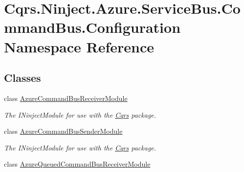 \hypertarget{namespaceCqrs_1_1Ninject_1_1Azure_1_1ServiceBus_1_1CommandBus_1_1Configuration}{}\section{Cqrs.\+Ninject.\+Azure.\+Service\+Bus.\+Command\+Bus.\+Configuration Namespace Reference}
\label{namespaceCqrs_1_1Ninject_1_1Azure_1_1ServiceBus_1_1CommandBus_1_1Configuration}
\subsection*{Classes}
\begin{DoxyCompactItemize}
\item 
class \hyperlink{classCqrs_1_1Ninject_1_1Azure_1_1ServiceBus_1_1CommandBus_1_1Configuration_1_1AzureCommandBusReceiverModule}{Azure\+Command\+Bus\+Receiver\+Module}
\begin{DoxyCompactList}\small\item\em The I\+Ninject\+Module for use with the \hyperlink{namespaceCqrs}{Cqrs} package. \end{DoxyCompactList}\item 
class \hyperlink{classCqrs_1_1Ninject_1_1Azure_1_1ServiceBus_1_1CommandBus_1_1Configuration_1_1AzureCommandBusSenderModule}{Azure\+Command\+Bus\+Sender\+Module}
\begin{DoxyCompactList}\small\item\em The I\+Ninject\+Module for use with the \hyperlink{namespaceCqrs}{Cqrs} package. \end{DoxyCompactList}\item 
class \hyperlink{classCqrs_1_1Ninject_1_1Azure_1_1ServiceBus_1_1CommandBus_1_1Configuration_1_1AzureQueuedCommandBusReceiverModule}{Azure\+Queued\+Command\+Bus\+Receiver\+Module}
\end{DoxyCompactItemize}
